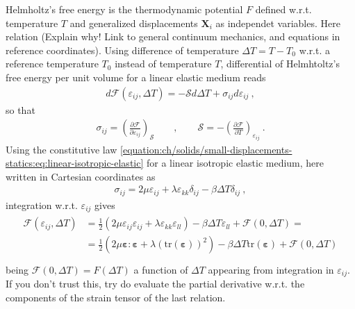 \documentclass[letterpaper,10pt,english]{jupyterBook}
\begin{document}
\sphinxAtStartPar
Helmholtz’s free energy is the thermodynamic potential \(F\) defined w.r.t. temperature \(T\) and generalized displacements \(\mathbf{X}_i\) as independet variables. Here  relation (Explain why! Link to general continuum mechanics, and equations in reference coordinates). Using difference of temperature \(\Delta T = T - T_0\) w.r.t. a reference temperature \(T_0\) instead of temperature \(T\), differential of Helmhtoltz’s free energy per unit volume for a linear elastic medium reads
\begin{equation*}
\begin{split}d\mathcal{F}(\varepsilon_{ij}, \Delta T) = - \mathcal{S} d \Delta T + \sigma_{ij} d \varepsilon_{ij} \ ,\end{split}
\end{equation*}
\sphinxAtStartPar
so that
\begin{equation*}
\begin{split}
\sigma_{ij} = \left( \frac{\partial \mathcal{F}}{\partial \varepsilon_{ij}} \right)_{\mathcal{S}}
\qquad , \qquad
\mathcal{S} = - \left( \frac{\partial \mathcal{F}}{\partial T} \right)_{\varepsilon_{ij}} \ .
\end{split}
\end{equation*}
\sphinxAtStartPar
Using the constitutive law \eqref{equation:ch/solids/small-displacements-statics:eq:linear-isotropic-elastic} for a linear isotropic elastic medium, here written in Cartesian coordinates as
\begin{equation*}
\begin{split}\sigma_{ij} = 2 \mu \varepsilon_{ij} + \lambda \varepsilon_{kk} \delta_{ij} - \beta \Delta T \delta_{ij} \ ,\end{split}
\end{equation*}
\sphinxAtStartPar
integration w.r.t. \(\varepsilon_{ij}\) gives
\begin{equation*}
\begin{split}\begin{aligned}
  \mathcal{F}(\varepsilon_{ij}, \Delta T) 
  & = \frac{1}{2} \left( 2  \mu \varepsilon_{ij} \varepsilon_{ij} + \lambda \varepsilon_{kk} \varepsilon_{ll} \right) - \beta \Delta T \varepsilon_{ll} + \mathcal{F}(0, \Delta T) = \\
  & = \frac{1}{2} \left( 2 \mu \symbf{\varepsilon} : \symbf{\varepsilon} + \lambda \left( \text{tr}(\symbf{\varepsilon}) \right)^2 \right) - \beta \Delta T \text{tr}(\symbf{\varepsilon}) + \mathcal{F}(0, \Delta T) \\
\end{aligned}\end{split}
\end{equation*}
\sphinxAtStartPar
being \(\mathcal{F}(0, \Delta T) = F(\Delta T)\) a function of \(\Delta T\) appearing from integration in \(\varepsilon_{ij}\). If you don’t trust this, try do evaluate the partial derivative w.r.t. the components of the strain tensor of the last relation.
\end{document}
